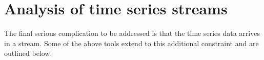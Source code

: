 \documentclass[11pt]{article}
\begin{document}
%

	\section{Analysis of time series streams}
	The final serious complication to be addressed is that the time series data arrives in a stream. Some of the above tools extend to this additional constraint and are outlined below.
\end{document}
